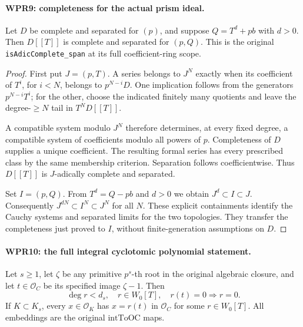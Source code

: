 \paragraph{WPR9: completeness for the actual prism ideal.}
\label{claim:WPR9}
Let $D$ be complete and separated for $(p)$, and suppose
$Q=T^d+pb$ with $d>0$. Then $D[[T]]$ is complete and
separated for $(p,Q)$. This is the original
\texttt{isAdicComplete\_span} at its full coefficient-ring scope.

\begin{proof}
First put $J=(p,T)$. A series belongs to $J^N$ exactly when
its coefficient of $T^i$, for $i<N$, belongs to $p^{N-i}D$.
One implication follows from the generators $p^{N-i}T^i$;
for the other, choose the indicated finitely many quotients and
leave the degree-$\geq N$ tail in $T^ND[[T]]$.

A compatible system modulo $J^N$ therefore determines, at every
fixed degree, a compatible system of coefficients modulo all
powers of $p$. Completeness of $D$ supplies a unique coefficient.
The resulting formal series has every prescribed class by the
same membership criterion. Separation follows coefficientwise.
Thus $D[[T]]$ is $J$-adically complete and separated.

Set $I=(p,Q)$. From $T^d=Q-pb$ and $d>0$ we obtain
$J^d\subset I\subset J$. Consequently
$J^{dN}\subset I^N\subset J^N$ for all $N$. These explicit
containments identify the Cauchy systems and separated limits
for the two topologies. They transfer the completeness just
proved to $I$, without finite-generation assumptions on $D$.
\end{proof}

\paragraph{WPR10: the full integral cyclotomic polynomial statement.}
\label{claim:WPR10}
Let $s\geq1$, let $\zeta$ be any primitive $p^s$-th root in
the original algebraic closure, and let
$t\in\mathcal O_C$ be its specified image $\zeta-1$.
Then
\[
 \deg r<d_s,\quad r\in W_0[T],\quad r(t)=0
                       \Longrightarrow r=0.                  \tag{WPR.13}
\]
If $K\subset K_s$, every $x\in\mathcal O_K$ has
$x=r(t)$ in $\mathcal O_C$ for some $r\in W_0[T]$.
All embeddings are the original $\mathrm{intToOC}$ maps.

